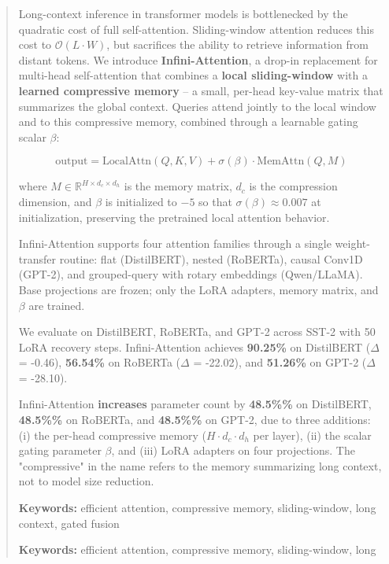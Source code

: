 \documentclass{article}
\begin{document}
\maketitle

\begin{abstract}
Long-context inference in transformer models is bottlenecked by the quadratic 
cost of full self-attention. Sliding-window attention reduces this cost to 
$\mathcal{O}(L \cdot W)$, but sacrifices the ability to retrieve information 
from distant tokens. We introduce \textbf{Infini-Attention}, a drop-in replacement 
for multi-head self-attention that combines a \textbf{local sliding-window} with a 
\textbf{learned compressive memory} -- a small, per-head key-value matrix that 
summarizes the global context. Queries attend jointly to the local window and 
to this compressive memory, combined through a learnable gating scalar $\beta$:

\[
\text{output} = \text{LocalAttn}(Q, K, V) + \sigma(\beta) \cdot \text{MemAttn}(Q, M)
\]

where $M \in \mathbb{R}^{H \times d_c \times d_h}$ is the memory matrix, 
$d_c$ is the compression dimension, and $\beta$ is initialized to $-5$ so 
that $\sigma(\beta) \approx 0.007$ at initialization, preserving the 
pretrained local attention behavior.

Infini-Attention supports four attention families through a single 
weight-transfer routine: flat (DistilBERT), nested (RoBERTa), causal Conv1D 
(GPT-2), and grouped-query with rotary embeddings (Qwen/LLaMA). Base 
projections are frozen; only the LoRA adapters, memory matrix, and $\beta$ 
are trained.

We evaluate on DistilBERT, RoBERTa, and GPT-2 across SST-2 with 
50 LoRA recovery steps. Infini-Attention achieves 
\textbf{90.25\%} on DistilBERT ($\Delta$ = -0.46), \textbf{56.54\%} on RoBERTa 
($\Delta$ = -22.02), and \textbf{51.26\%} on GPT-2 ($\Delta$ = -28.10). 

Infini-Attention \textbf{increases} parameter count by \textbf{48.5\%\%} 
on DistilBERT, \textbf{48.5\%\%} on RoBERTa, and 
\textbf{48.5\%\%} on GPT-2, due to three additions: (i) the 
per-head compressive memory ($H \cdot d_c \cdot d_h$ per layer), (ii) the 
scalar gating parameter $\beta$, and (iii) LoRA adapters on four projections. 
The "compressive" in the name refers to the memory summarizing long context, 
not to model size reduction.

\textbf{Keywords:} efficient attention, compressive memory, sliding-window, long 
context, gated fusion



\vspace{0.5em}
\noindent\textbf{Keywords:} efficient attention, compressive memory, sliding-window, long
\end{abstract}
\end{document}
